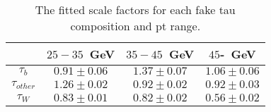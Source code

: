 \begin{table}
\footnotesize
\caption{The fitted scale factors for each fake tau composition and pt range.}
\centering
\begin{tabular}{|c|c|c|c|} \hline
 & $25-35$~GeV & $35-45$~GeV & $45$-~GeV\\\hline
$\tau_{b}$ & $0.91\pm0.06$ & $1.37\pm0.07$ & $1.06\pm0.06$\\\hline
$\tau_{other}$ & $1.26\pm0.02$ & $0.92\pm0.02$ & $0.92\pm0.03$\\\hline
$\tau_{W}$ & $0.83\pm0.01$ & $0.82\pm0.02$ & $0.56\pm0.02$\\\hline
\end{tabular}
\label{tab:scale_factor}
\end{table}
